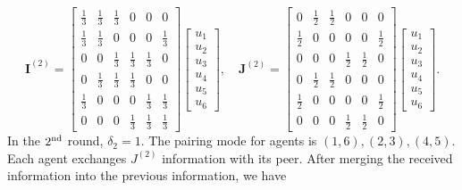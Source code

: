 \documentclass{article}
\newcommand{\vI}{\mathbf{I}}
\newcommand{\vJ}{\mathbf{J}}
\theoremstyle{plain}
\theoremstyle{definition}
\begin{document}
$$
\vI^{(2)}
=
\left[
\begin{array}{cccccc}
    \frac{1}{3} & \frac{1}{3} & \frac{1}{3} & 0 & 0 & 0 \\
    \frac{1}{3} & \frac{1}{3} & 0 & 0 & 0 & \frac{1}{3} \\
    0 & 0 & \frac{1}{3} & \frac{1}{3} & \frac{1}{3} & 0 \\
    0 & \frac{1}{3} & \frac{1}{3} & \frac{1}{3} & 0 & 0 \\
    \frac{1}{3} & 0 &  0 & 0 & \frac{1}{3} & \frac{1}{3}  \\
    0 & 0 & 0 & \frac{1}{3} & \frac{1}{3} & \frac{1}{3} 
\end{array}
\right]
\left[
\begin{array}{c}
     u_1  \\
     u_2  \\
     u_3  \\
     u_4  \\
     u_5  \\
     u_6
\end{array}
\right],\quad
\vJ^{(2)}
=
\left[
\begin{array}{cccccc}
    0 & \frac{1}{2} & \frac{1}{2}& 0 & 0 & 0  \\
    \frac{1}{2} & 0 & 0 & 0 & 0 & \frac{1}{2} \\
    0 & 0 & 0 & \frac{1}{2} & \frac{1}{2} & 0 \\
    0 & \frac{1}{2} & \frac{1}{2} & 0 & 0 & 0 \\
    \frac{1}{2} & 0 & 0 & 0  & 0 & \frac{1}{2}  \\
    0 & 0 & 0 & \frac{1}{2} & \frac{1}{2} & 0 
\end{array}
\right]
\left[
\begin{array}{c}
     u_1  \\
     u_2  \\
     u_3  \\
     u_4  \\
     u_5  \\
     u_6
\end{array}
\right].
$$
In the $2^{\textup{nd}}$ round, $\delta_2=1$. The pairing mode for agents is $(1,6),(2,3),(4,5)$. {Each agent exchanges $J^{(2)}$ information with its peer.} After merging the received information into the previous information, we have
\end{document}
